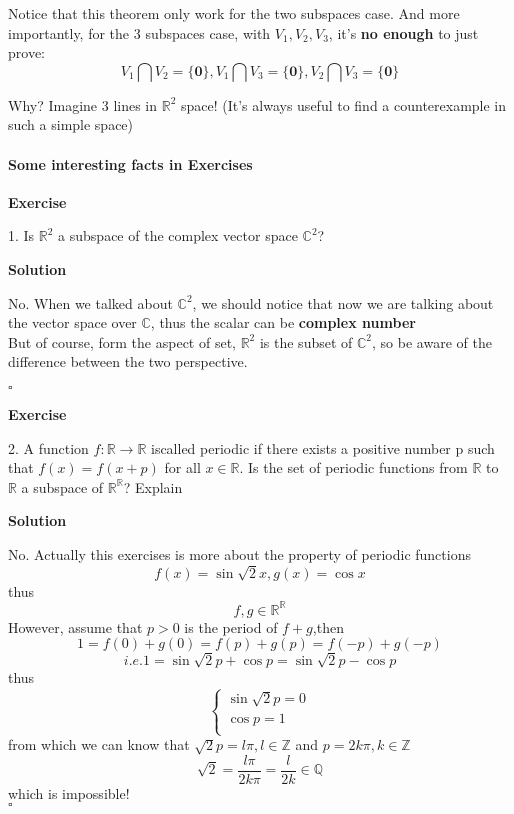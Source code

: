 \documentclass{article}
\newenvironment{exercise}{%
{\textbf{Exercise\\}
    }
}{
}
\newenvironment{solution}{%
{
    \textbf{Solution\\}
    }
}{
  \hfill $\square$ 
  \par\bigskip 
}
\newcommand{\RR}{\mathbb{R}}
\newcommand{\CC}{\mathbb{C}}
\newcommand{\QQ}{\mathbb{Q}}
\newcommand{\ZZ}{\mathbb{Z}}
\newcommand{\ve}{\boldsymbol}
\begin{document}
\begin{CJK}{UTF8}{gkai}
Notice that this theorem only work for the two subspaces case. And more importantly, for the $3$ subspaces case, with $V_1,V_2,V_3$, it's \textbf{no enough} to just prove:
\[V_1 \bigcap V_2 =\{\ve{0}\}, V_1 \bigcap V_3 =\{\ve{0}\}, V_2 \bigcap V_3 =\{\ve{0}\}\]

Why? Imagine $3$ lines in $\RR^2$ space! (It's always useful to find a counterexample in such a simple space)

\paragraph{Some interesting facts in Exercises\\}
\begin{exercise}
1. Is $\RR^2$ a subspace of the complex vector space $\CC^2$?\\
\end{exercise}

\begin{solution}

No. When we talked about $\CC^2$, we should notice that now we are talking about the vector space over $\CC$, thus the scalar can be \textbf{complex number}\\

But of course, form the aspect of set, $\RR^2$ is the subset of $\CC^2$, so be aware of the difference between the two perspective.
\end{solution}

\begin{exercise}
2. A function $f: \RR \rightarrow \RR$ iscalled periodic if there exists a positive number p such that $f(x) = f(x + p)$ for all $x \in \RR$. Is the set of periodic functions from $\RR$ to $\RR$ a subspace of $\RR^{\RR}$? Explain\\
\end{exercise}

\begin{solution}

No. Actually this exercises is more about the property of periodic functions
\[f(x) = \sin \sqrt{2} x , g(x) = \cos  x\]
thus
\[f,g\in \RR^{\RR}\]
However, assume that $p > 0$ is the period of $f + g$,then
\[1 = f(0) + g(0) = f(p) + g(p) = f(-p)+ g(-p)\]
\[i.e. 1 = \sin \sqrt{2} p + \cos  p = \sin \sqrt{2} p - \cos  p\]
thus
\[
\begin{cases}
    \sin \sqrt{2} p = 0\\
    \cos p = 1\\  
\end{cases}    
\]
from which we can know that $\sqrt{2} p = l \pi, l\in \ZZ$ and $p = 2k \pi, k\in \ZZ$ 
\[\sqrt{2} = \dfrac{l\pi}{2k\pi} = \dfrac{l}{2k} \in\QQ\] 
which is impossible!\\
\end{solution}



\end{CJK}
\end{document}
